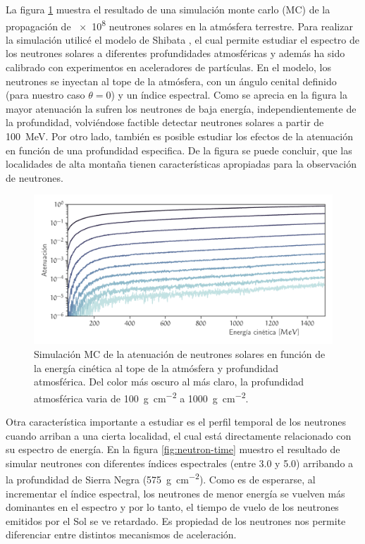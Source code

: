 La figura \ref{fig:neutron-at} muestra el resultado de una simulación monte carlo (MC) de la propagación de \num{e8} neutrones solares en la atmósfera terrestre. Para realizar la simulación utilicé el modelo de Shibata \cite{shibata94}, el cual permite estudiar el espectro de los neutrones solares a diferentes profundidades atmosféricas y además ha sido calibrado con experimentos en aceleradores de partículas. En el modelo, los neutrones se inyectan al tope de la atmósfera, con un ángulo cenital definido (para nuestro caso $\theta=0$) y un índice espectral. Como se aprecia en la figura la mayor atenuación la sufren los neutrones de baja energía, independientemente de la profundidad, volviéndose factible detectar neutrones solares a partir de \SI{100}{\mega\electronvolt}. Por otro lado, también es posible estudiar los efectos de la atenuación en función de una profundidad especifica. De la figura se puede concluir, que las localidades de alta montaña tienen características apropiadas para la observación de neutrones.

\begin{figure}
        \centering
        \includegraphics[width=\textwidth]{neutron-at.pdf}
        \caption{Simulación MC de la atenuación de neutrones solares en función de la energía cinética al tope de la atmósfera y profundidad atmosférica. Del color más oscuro al más claro, la profundidad atmosférica varia de \SI{100}{\gram\per\square\cm} a \SI{1000}{\gram\per\square\cm}.}
        \label{fig:neutron-at}
\end{figure}

Otra característica importante a estudiar es el perfil temporal de los neutrones cuando arriban a una cierta localidad, el cual está directamente relacionado con su espectro de energía. En la figura \ref{fig:neutron-time} muestro el resultado de simular neutrones con diferentes índices espectrales (entre \num{3.0} y \num{5.0}) arribando a la profundidad de Sierra Negra (\SI{575}{\gram\per\square\cm}). Como es de esperarse, al incrementar el índice espectral, los neutrones de menor energía se vuelven más dominantes en el espectro y por lo tanto, el tiempo de vuelo de los neutrones emitidos por el Sol se ve retardado. Es propiedad de los neutrones nos permite diferenciar entre distintos mecanismos de aceleración.

